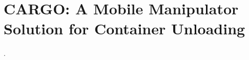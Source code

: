 \chapter{CARGO: A Mobile Manipulator Solution for Container Unloading}\label{appx:cargo}
\begin{description}[leftmargin=1cm,style=nextline,font=\normalfont]
\item[\cite{lopes:icara:2026}] .
\end{description}

\cleardoublepage


